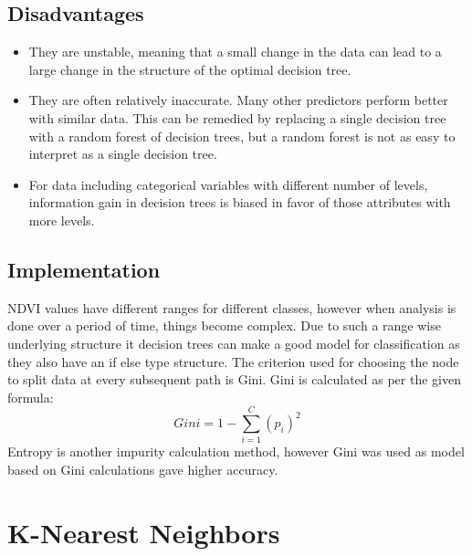 \documentclass[12pt, a4paper]{report}
\begin{document}
\subsection{Disadvantages}
\begin{itemize}
\item They are unstable, meaning that a small change in the data can lead to a large change in the structure of the optimal decision tree.
\item They are often relatively inaccurate. Many other predictors perform better with similar data. This can be remedied by replacing a single decision tree with a random forest of decision trees, but a random forest is not as easy to interpret as a single decision tree.
\item For data including categorical variables with different number of levels, information gain in decision trees is biased in favor of those attributes with more levels.
\end{itemize}
\subsection{Implementation}
NDVI values have different ranges for different classes, however when analysis is done over a period of time, things become complex. Due to such a range wise  underlying structure it decision trees can make a good model for classification as they also have an if else type structure. The criterion used for choosing the node to split data at every subsequent path is Gini. Gini is calculated as per the given formula:
\begin{displaymath}
Gini=1-\sum_{i=1}^{C}(p_i)^2
\end{displaymath}
Entropy is another impurity calculation method, however Gini was used as model based on Gini calculations gave higher accuracy.
\section{K-Nearest Neighbors}
\end{document}

